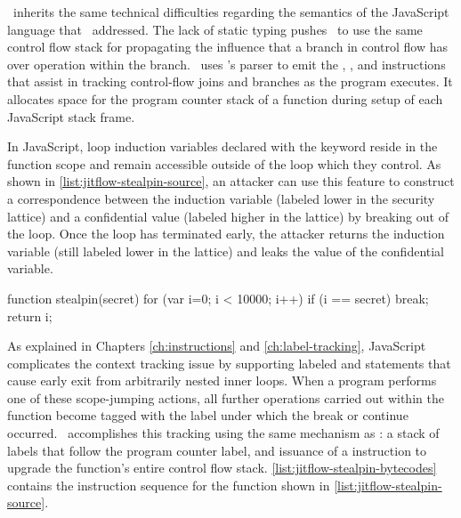 \JitFlow\ inherits the same technical difficulties regarding the semantics of the JavaScript language that \FlowCore\ addressed.
The lack of static typing pushes \JitFlow\ to use the same control flow stack for propagating the influence that a branch in control flow has over operation within the branch.
\JitFlow\ uses \FlowCore's parser to emit the \dup, \join, and \popj instructions that assist in tracking control-flow joins and branches as the program executes.
It allocates space for the program counter stack of a function during setup of each JavaScript stack frame.

In JavaScript, loop induction variables declared with the  keyword reside in the function scope and remain accessible outside of the loop which they control.
As shown in \autoref{list:jitflow-stealpin-source}, an attacker can use this feature to construct a correspondence between the induction variable (labeled lower in the security lattice) and a confidential value (labeled higher in the lattice) by breaking out of the loop.
Once the loop has terminated early, the attacker returns the induction variable (still labeled lower in the lattice) and leaks the value of the confidential variable.

\begin{jscode}
function stealpin(secret) {
  for (var i=0; i < 10000; i++) {
    if (i == secret)
      break;
  }
  return i;
}
\end{jscode}

As explained in Chapters \ref{ch:instructions} and \ref{ch:label-tracking}, JavaScript complicates the context tracking issue by supporting labeled  and  statements that cause early exit from arbitrarily nested inner loops.
When a program performs one of these scope-jumping actions, all further operations carried out within the function become tagged with the label under which the break or continue occurred.
\JitFlow\ accomplishes this tracking using the same mechanism as \FlowCore: a stack of labels that follow the program counter label, and issuance of a \popj instruction to upgrade the function's entire control flow stack.
\autoref{list:jitflow-stealpin-bytecodes} contains the instruction sequence for the  function shown in \autoref{list:jitflow-stealpin-source}.

